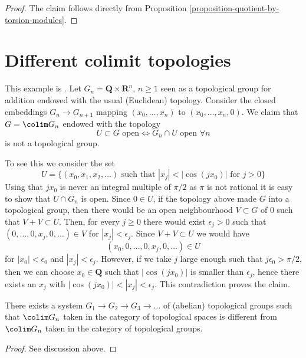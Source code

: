 \begin{proof}
The claim follows directly from
Proposition \ref{proposition-quotient-by-torsion-modules}.
\end{proof}




\section{Different colimit topologies}
\label{section-colimit-topology}

\noindent
This example is \cite[Example 1.2, page 553]{TSH}. Let
$G_n = \mathbf{Q} \times \mathbf{R}^n$, $n \geq 1$ seen as a topological group
for addition endowed with the usual (Euclidean) topology. Consider the closed
embeddings $G_n \to G_{n + 1}$ mapping $(x_0, \ldots, x_n)$ to
$(x_0, \ldots, x_n, 0)$. We claim that $G = \colim G_n$ endowed with the
topology
$$
U \subset G\text{ open} \Leftrightarrow G_n \cap U\text{ open }\forall n
$$
is not a topological group.

\medskip\noindent
To see this we consider the set
$$
U = \{(x_0, x_1, x_2, \ldots)\text{ such that }
|x_j| < |\cos(jx_0)| \text{ for } j > 0\}
$$
Using that $jx_0$ is never an integral multiple of $\pi/2$ as $\pi$
is not rational it is easy to show that $U \cap G_n$ is open. Since
$0 \in U$, if the topology above made $G$ into a topological group,
then there would be an open neighbourhood $V \subset G$ of $0$
such that $V + V \subset U$. Then, for every $j \geq 0$ there would
exist $\epsilon_j > 0$ such that $(0, \ldots, 0, x_j, 0, \ldots) \in V$
for $|x_j| < \epsilon_j$. Since $V + V \subset U$ we would have
$$
(x_0, 0, \ldots, 0, x_j, 0, \ldots) \in U
$$
for $|x_0| < \epsilon_0$ and $|x_j| < \epsilon_j$. However, if we
take $j$ large enough such that $j \epsilon_0 > \pi/2$, then we can
choose $x_0 \in \mathbf{Q}$ such that $|\cos(jx_0)|$ is smaller than
$\epsilon_j$, hence there exists an $x_j$ with
$|\cos(jx_0)| < |x_j| < \epsilon_j$. This contradiction proves the claim.

\begin{lemma}
\label{lemma-colimit-topology}
There exists a system $G_1 \to G_2 \to G_3 \to \ldots$ of (abelian)
topological groups such that $\colim G_n$ taken in the category of
topological spaces is different from $\colim G_n$ taken in the category
of topological groups.
\end{lemma}

\begin{proof}
See discussion above.
\end{proof}






